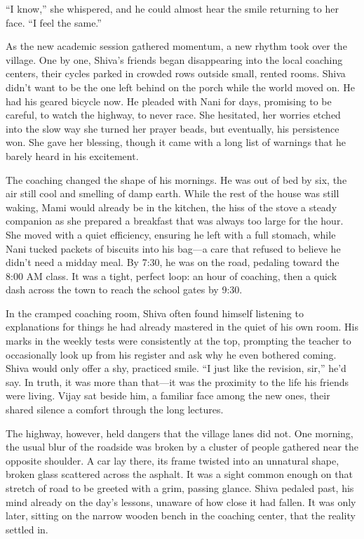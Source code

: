 ``I know,'' she whispered, and he could almost hear the smile returning to her face. ``I feel the same.''

As the new academic session gathered momentum, a new rhythm took over the village. One by one, Shiva's friends began disappearing into the local coaching centers, their cycles parked in crowded rows outside small, rented rooms. Shiva didn't want to be the one left behind on the porch while the world moved on. He had his geared bicycle now. He pleaded with Nani for days, promising to be careful, to watch the highway, to never race. She hesitated, her worries etched into the slow way she turned her prayer beads, but eventually, his persistence won. She gave her blessing, though it came with a long list of warnings that he barely heard in his excitement.

The coaching changed the shape of his mornings. He was out of bed by six, the air still cool and smelling of damp earth. While the rest of the house was still waking, Mami would already be in the kitchen, the hiss of the stove a steady companion as she prepared a breakfast that was always too large for the hour. She moved with a quiet efficiency, ensuring he left with a full stomach, while Nani tucked packets of biscuits into his bag—a care that refused to believe he didn't need a midday meal. By 7:30, he was on the road, pedaling toward the 8:00 AM class. It was a tight, perfect loop: an hour of coaching, then a quick dash across the town to reach the school gates by 9:30.

In the cramped coaching room, Shiva often found himself listening to explanations for things he had already mastered in the quiet of his own room. His marks in the weekly tests were consistently at the top, prompting the teacher to occasionally look up from his register and ask why he even bothered coming. Shiva would only offer a shy, practiced smile. ``I just like the revision, sir,'' he'd say. In truth, it was more than that—it was the proximity to the life his friends were living. Vijay sat beside him, a familiar face among the new ones, their shared silence a comfort through the long lectures.

The highway, however, held dangers that the village lanes did not. One morning, the usual blur of the roadside was broken by a cluster of people gathered near the opposite shoulder. A car lay there, its frame twisted into an unnatural shape, broken glass scattered across the asphalt. It was a sight common enough on that stretch of road to be greeted with a grim, passing glance. Shiva pedaled past, his mind already on the day's lessons, unaware of how close it had fallen. It was only later, sitting on the narrow wooden bench in the coaching center, that the reality settled in.

